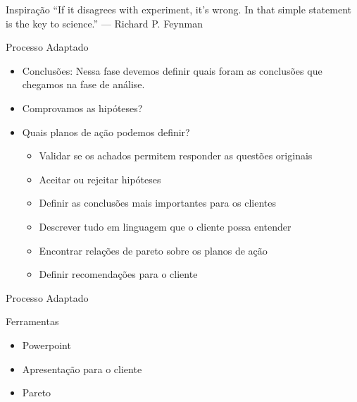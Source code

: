 \begin{frame}
	\begin{block}{Inspiração}
		``If it disagrees with experiment, it’s wrong. In that simple statement is the key to science.'' — Richard P. Feynman
	\end{block}
\end{frame}



\begin{frame}
	\begin{block}{Processo Adaptado}
		\begin{itemize}
		\item Conclusões: Nessa fase devemos definir quais foram as conclusões que chegamos na fase de análise.
		\item Comprovamos as hipóteses?
		\item Quais planos de ação podemos definir?
		
				\begin{itemize}
					\item Validar se os achados permitem responder as questões originais
					\item Aceitar ou rejeitar hipóteses
					\item Definir as conclusões mais importantes para os clientes
					\item Descrever tudo em linguagem que o cliente possa entender
					\item Encontrar relações de pareto sobre os planos de ação
					\item Definir recomendações para o cliente					
				\end{itemize}		
		\end{itemize}
	\end{block}
\end{frame}

    
\begin{frame}
	\begin{block}{Processo Adaptado}
	
		Ferramentas
		\begin{itemize}
			\item Powerpoint
			\item Apresentação para o cliente
			\item Pareto
		\end{itemize}
	\end{block}
\end{frame}



